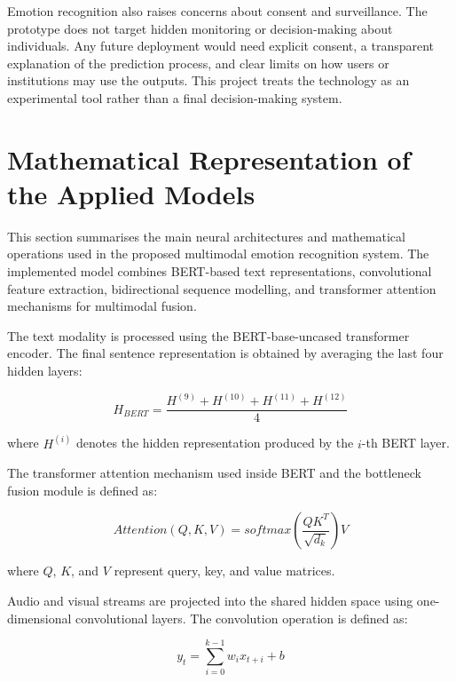Emotion recognition also raises concerns about consent and surveillance. The prototype does not target hidden monitoring or decision-making about individuals. Any future deployment would need explicit consent, a transparent explanation of the prediction process, and clear limits on how users or institutions may use the outputs. This project treats the technology as an experimental tool rather than a final decision-making system.

\section{Mathematical Representation of the Applied Models}
\label{sec:model_formulations}

This section summarises the main neural architectures and mathematical operations used in the proposed multimodal emotion recognition system. The implemented model combines BERT-based text representations, convolutional feature extraction, bidirectional sequence modelling, and transformer attention mechanisms for multimodal fusion.

The text modality is processed using the BERT-base-uncased transformer encoder. The final sentence representation is obtained by averaging the last four hidden layers:

\begin{equation}
H_{BERT} =
\frac{
H^{(9)} + H^{(10)} + H^{(11)} + H^{(12)}
}{4}
\end{equation}

where $H^{(i)}$ denotes the hidden representation produced by the $i$-th BERT layer.

The transformer attention mechanism used inside BERT and the bottleneck fusion module is defined as:

\begin{equation}
Attention(Q,K,V)
=
softmax
\left(
\frac{QK^T}{\sqrt{d_k}}
\right)V
\end{equation}

where $Q$, $K$, and $V$ represent query, key, and value matrices.

Audio and visual streams are projected into the shared hidden space using one-dimensional convolutional layers. The convolution operation is defined as:

\begin{equation}
y_t =
\sum_{i=0}^{k-1}
w_i x_{t+i}
+
b
\end{equation}

